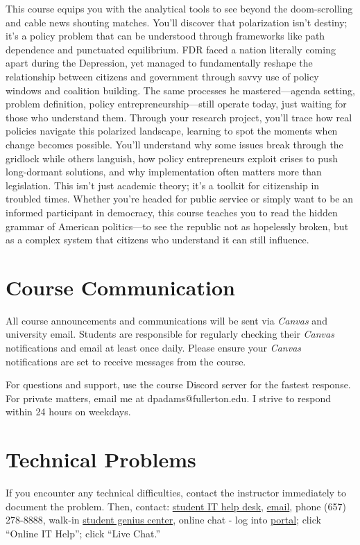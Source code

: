 \documentclass[12pt]{article}     %
\begin{document}
This course equips you with the analytical tools to see beyond the doom-scrolling and cable news shouting matches. You'll discover that polarization isn't destiny; it's a policy problem that can be understood through frameworks like path dependence and punctuated equilibrium. FDR faced a nation literally coming apart during the Depression, yet managed to fundamentally reshape the relationship between citizens and government through savvy use of policy windows and coalition building. The same processes he mastered---agenda setting, problem definition, policy entrepreneurship---still operate today, just waiting for those who understand them. Through your research project, you'll trace how real policies navigate this polarized landscape, learning to spot the moments when change becomes possible. You'll understand why some issues break through the gridlock while others languish, how policy entrepreneurs exploit crises to push long-dormant solutions, and why implementation often matters more than legislation. This isn't just academic theory; it's a toolkit for citizenship in troubled times. Whether you're headed for public service or simply want to be an informed participant in democracy, this course teaches you to read the hidden grammar of American politics---to see the republic not as hopelessly broken, but as a complex system that citizens who understand it can still influence.

\section{Course Communication}
All course announcements and communications will be sent via \emph{Canvas} and university email. Students are responsible for regularly checking their \emph{Canvas} notifications and email at least once daily. Please ensure your \emph{Canvas} notifications are set to receive messages from the course.

For questions and support, use the course Discord server for the fastest response. For private matters, email me at dpadams@fullerton.edu. I strive to respond within 24 hours on weekdays.

\section{Technical Problems}
If you encounter any technical difficulties, contact the instructor immediately to document the problem. Then, contact: \href{http://www.fullerton.edu/it/students/helpdesk/index.php}{student IT help desk}, \href{mailto:StudentITHelpDesk@fullerton.edu}{email}, phone (657) 278-8888, walk-in \href{http://www.fullerton.edu/it/students/sgc/index.php}{student genius center}, online chat - log into \href{http://my.fullerton.edu}{portal}; click ``Online IT Help''; click ``Live Chat.''
\end{document}
